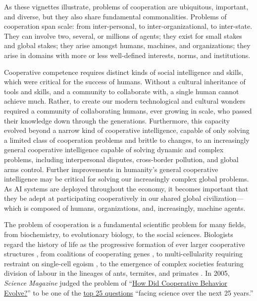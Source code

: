 \documentclass[11pt, a4paper, logo, onecolumn, nonumbering]{deepmind}
\begin{document}
As these vignettes illustrate, problems of cooperation are ubiquitous, important, and diverse, but they also share fundamental commonalities.  Problems of cooperation span scale: from inter-personal, to inter-organizational, to inter-state. They can involve two, several, or millions of agents; they exist for small stakes and global stakes; they arise amongst humans, machines, and organizations; they arise in domains with more or less well-defined interests, norms, and institutions. 

Cooperative competence requires distinct kinds of social intelligence and skills, which were critical for the success of humans.
Without a cultural inheritance of tools and skills, and a community to collaborate with, a single human cannot achieve much.  Rather, to create our modern technological and cultural wonders required a community of collaborating humans, ever growing in scale, who passed their knowledge down through the generations. Furthermore, this capacity evolved beyond a narrow kind of cooperative intelligence, capable of only solving a limited class of cooperation problems and brittle to changes, to an increasingly general cooperative intelligence capable of solving dynamic and complex problems, including interpersonal disputes, cross-border pollution, and global arms control. Further improvements in humanity's general cooperative intelligence may be critical for solving our increasingly complex global problems.
As AI systems are deployed throughout the economy, it becomes important that they be adept at participating cooperatively in our shared global civilization---which is composed of humans, organizations, and, increasingly, machine agents.

The problem of cooperation is a fundamental scientific problem for many fields, from biochemistry, to evolutionary biology, to the social sciences.
Biologists regard the history of life as the progressive formation of ever larger cooperative structures \cite{smith1997major}, from coalitions of cooperating genes \cite{smith1993origin}, to multi-cellularity requiring restraint on single-cell egoism \cite{buss1987evolution, frank2004problems}, to the emergence of complex societies featuring division of labour in the lineages of ants, termites, and primates \cite{robinson1992regulation, mueller2005evolution}.
In 2005, \textit{Science Magazine} judged the problem of ``\href{https://science.sciencemag.org/content/309/5731/93.full}{How Did Cooperative Behavior Evolve?}'' to be one of the \href{https://www.sciencemag.org/site/feature/misc/webfeat/125th/}{top 25 questions}  ``facing science over the next 25 years.'' 
\end{document}
